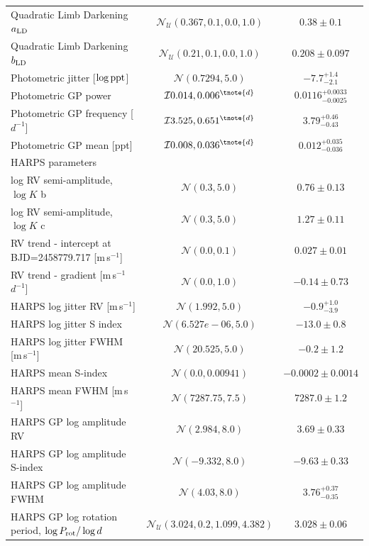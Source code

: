 \documentclass[fleqn,usenatbib]{mnras}
\newcommand{\harps}{{HARPS}}
\newcommand{\ms}{m\,s$^{-1}$}
\begin{document}
\begin{table}
\begin{center}
\begin{tabular}{lcc}
Quadratic Limb Darkening $a_{\rm LD}$ &  $\mathcal{N}_{\mathcal{U}}(0.367,0.1,0.0,1.0)$  &   $ 0.38 \pm 0.1 $ \\
Quadratic Limb Darkening $b_{\rm LD}$ &  $\mathcal{N}_{\mathcal{U}}(0.21,0.1,0.0,1.0)$  &   $ 0.208 \pm 0.097 $ \\
Photometric jitter [$\log{\rm ppt}$] &  $\mathcal{N}(0.7294,5.0)$  &   $ -7.7^{+1.4}_{-2.1} $ \\
Photometric GP power & $\mathcal{I}{0.014,0.006}^{\tnote{d}}$  &   $ 0.0116^{+0.0033}_{-0.0025} $ \\
Photometric GP frequency [$d^{-1}$] & $\mathcal{I}{3.525,0.651}^{\tnote{d}}$  &   $ 3.79^{+0.46}_{-0.43} $ \\
Photometric GP mean [ppt] & $\mathcal{I}{0.008,0.036}^{\tnote{d}}$  &   $ 0.012^{+0.035}_{-0.036} $ \\
\hline
\multicolumn{3}{l}{\harps{} parameters}\\
log RV semi-amplitude, $\log{K}$ b &  $\mathcal{N}(0.3,5.0)$  &   $ 0.76 \pm 0.13 $ \\
log RV semi-amplitude, $\log{K}$ c &  $\mathcal{N}(0.3,5.0)$  &   $ 1.27 \pm 0.11 $ \\
RV trend - intercept at BJD=2458779.717 [\ms{}] &  $\mathcal{N}(0.0,0.1)$  &   $ 0.027 \pm 0.01 $ \\
RV trend - gradient [\ms{}$d^{-1}$] &  $\mathcal{N}(0.0,1.0)$  &   $ -0.14 \pm 0.73 $ \\
\harps{} log jitter RV [\ms{}] &  $\mathcal{N}(1.992,5.0)$  &   $ -0.9^{+1.0}_{-3.9} $ \\
\harps{} log jitter S index &  $\mathcal{N}(6.527e-06,5.0)$  &   $ -13.0 \pm 0.8 $ \\
\harps{} log jitter FWHM [\ms{}] &  $\mathcal{N}(20.525,5.0)$  &   $ -0.2 \pm 1.2 $ \\
\harps{} mean S-index &  $\mathcal{N}(0.0,0.00941)$  &   $ -0.0002 \pm 0.0014 $ \\
\harps{} mean FWHM [\ms{}] &  $\mathcal{N}(7287.75,7.5)$  &   $ 7287.0 \pm 1.2 $ \\
\harps{} GP log amplitude RV &  $\mathcal{N}(2.984,8.0)$  &   $ 3.69 \pm 0.33 $ \\
\harps{} GP log amplitude S-index &  $\mathcal{N}(-9.332,8.0)$  &   $ -9.63 \pm 0.33 $ \\
\harps{} GP log amplitude FWHM &  $\mathcal{N}(4.03,8.0)$  &   $ 3.76^{+0.37}_{-0.35} $ \\
\harps{} GP log rotation period, $\log{P_{\rm rot}}/\log{d}$ &  $\mathcal{N}_{\mathcal{U}}(3.024,0.2,1.099,4.382)$  &   $ 3.028 \pm 0.06 $ \\

\end{tabular}
\end{center}
\end{table}
\end{document}
